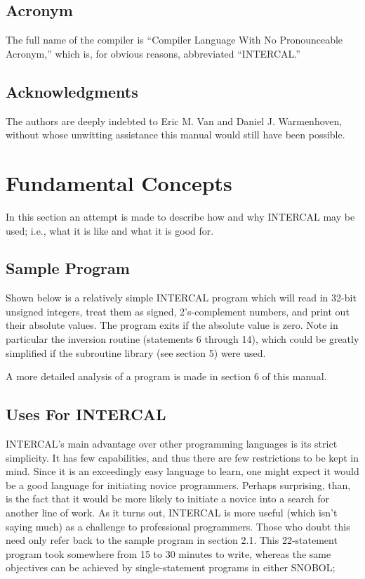 \subsection{Acronym}

The full name of the compiler is ``Compiler Language With No Pronounceable
Acronym,'' which is, for obvious reasons, abbreviated ``INTERCAL.''

\subsection{Acknowledgments}

The authors are deeply indebted to Eric M. Van and Daniel J. Warmenhoven,
without whose unwitting assistance this manual would still have been
possible.








\section{Fundamental Concepts}

In this section an attempt is made to describe how and why INTERCAL may be
used; i.e., what it is like and what it is good for.

\subsection{Sample Program}

Shown below is a relatively simple INTERCAL program which will read in
32-bit unsigned integers, treat them as signed, 2's-complement numbers, and
print out their absolute values.  The program exits if the absolute value
is zero.  Note in particular the inversion routine (statements 6 through
14), which could be greatly simplified if the subroutine library (see
section 5) were used.

A more detailed analysis of a program is made in section 6 of this manual.



\subsection{Uses For INTERCAL}

INTERCAL's main advantage over other programming languages is its strict
simplicity.  It has few capabilities, and thus there are few restrictions
to be kept in mind.  Since it is an exceedingly easy language to learn, one
might expect it would be a good language for initiating novice programmers.
Perhaps surprising, than, is the fact that it would be more likely to
initiate a novice into a search for another line of work.  As it turns out,
INTERCAL is more useful (which isn't saying much) as a challenge to
professional programmers.  Those who doubt this need only refer back to the
sample program in section 2.1.  This 22-statement program took somewhere
from 15 to 30 minutes to write, whereas the same objectives can be achieved
by single-statement programs in either SNOBOL;

